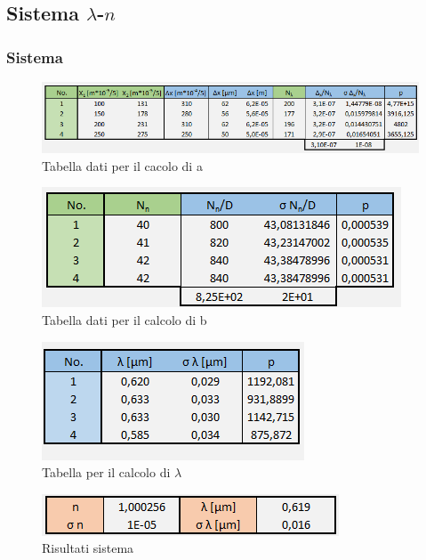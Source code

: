 \documentclass{article}
\begin{document}
\subsection{Sistema $\lambda$-$n$}
\subsubsection{Sistema}

\begin{figure}[h!]
  \centering
  \includegraphics[width=1\linewidth]{IM tabella a}
  \caption{Tabella dati per il cacolo di a}
\end{figure}

\begin{figure}[h!]
  \centering
  \includegraphics[width=0.6\linewidth]{IM tabella b}
  \caption{Tabella dati per il calcolo di b}
\end{figure}

\begin{figure}[h!]
  \centering
  \includegraphics[width=0.4\linewidth]{IM tabella lambda sistema}
  \caption{Tabella per il calcolo di $\lambda$}
\end{figure}

\begin{figure}[h!]
  \centering
  \includegraphics[width=0.6\linewidth]{IM risultati sistema}
  \caption{Risultati sistema}
\end{figure}

\pagebreak 
\end{document}
